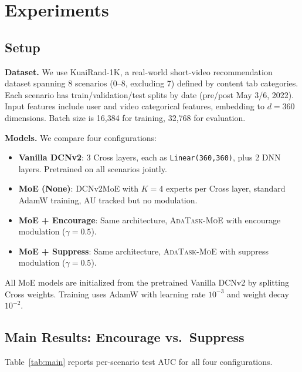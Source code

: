 \documentclass{article}
\begin{document}
\section{Experiments}
\label{sec:experiments}

\subsection{Setup}
\label{sec:setup}

\textbf{Dataset.} We use KuaiRand-1K, a real-world short-video recommendation dataset spanning 8 scenarios (0--8, excluding 7) defined by content tab categories.
Each scenario has train/validation/test splits by date (pre/post May 3/6, 2022).
Input features include user and video categorical features, embedding to $d=360$ dimensions.
Batch size is 16,384 for training, 32,768 for evaluation.

\textbf{Models.} We compare four configurations:
\begin{itemize}
    \item \textbf{Vanilla DCNv2}: 3 Cross layers, each as \texttt{Linear(360,360)}, plus 2 DNN layers. Pretrained on all scenarios jointly.
    \item \textbf{MoE (None)}: DCNv2MoE with $K=4$ experts per Cross layer, standard AdamW training, AU tracked but no modulation.
    \item \textbf{MoE + Encourage}: Same architecture, \textsc{AdaTask-MoE} with encourage modulation ($\gamma=0.5$).
    \item \textbf{MoE + Suppress}: Same architecture, \textsc{AdaTask-MoE} with suppress modulation ($\gamma=0.5$).
\end{itemize}
All MoE models are initialized from the pretrained Vanilla DCNv2 by splitting Cross weights.
Training uses AdamW with learning rate $10^{-3}$ and weight decay $10^{-2}$.

\subsection{Main Results: Encourage vs.\ Suppress}
\label{sec:main}

Table~\ref{tab:main} reports per-scenario test AUC for all four configurations.
\end{document}

